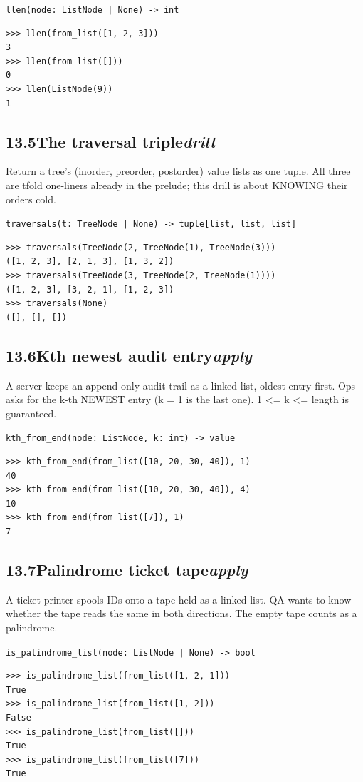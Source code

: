 \documentclass[10pt,letterpaper]{book}
\begin{document}
\noindent\texttt{llen(node: ListNode | None) -> int}
\begin{lstlisting}[style=ex]
>>> llen(from_list([1, 2, 3]))
3
>>> llen(from_list([]))
0
>>> llen(ListNode(9))
1
\end{lstlisting}
\subsection*{13.5\quad The traversal triple\hfill\textnormal{\textit{drill}}}
Return a tree's (inorder, preorder, postorder) value lists as one tuple. All three are tfold one-liners already in the prelude; this drill is about KNOWING their orders cold.

\noindent\texttt{traversals(t: TreeNode | None) -> tuple[list, list, list]}
\begin{lstlisting}[style=ex]
>>> traversals(TreeNode(2, TreeNode(1), TreeNode(3)))
([1, 2, 3], [2, 1, 3], [1, 3, 2])
>>> traversals(TreeNode(3, TreeNode(2, TreeNode(1))))
([1, 2, 3], [3, 2, 1], [1, 2, 3])
>>> traversals(None)
([], [], [])
\end{lstlisting}
\subsection*{13.6\quad Kth newest audit entry\hfill\textnormal{\textit{apply}}}
A server keeps an append-only audit trail as a linked list, oldest entry first. Ops asks for the k-th NEWEST entry (k = 1 is the last one). 1 <= k <= length is guaranteed.

\noindent\texttt{kth\_from\_end(node: ListNode, k: int) -> value}
\begin{lstlisting}[style=ex]
>>> kth_from_end(from_list([10, 20, 30, 40]), 1)
40
>>> kth_from_end(from_list([10, 20, 30, 40]), 4)
10
>>> kth_from_end(from_list([7]), 1)
7
\end{lstlisting}
\subsection*{13.7\quad Palindrome ticket tape\hfill\textnormal{\textit{apply}}}
A ticket printer spools IDs onto a tape held as a linked list. QA wants to know whether the tape reads the same in both directions. The empty tape counts as a palindrome.

\noindent\texttt{is\_palindrome\_list(node: ListNode | None) -> bool}
\begin{lstlisting}[style=ex]
>>> is_palindrome_list(from_list([1, 2, 1]))
True
>>> is_palindrome_list(from_list([1, 2]))
False
>>> is_palindrome_list(from_list([]))
True
>>> is_palindrome_list(from_list([7]))
True
\end{lstlisting}
\end{document}
